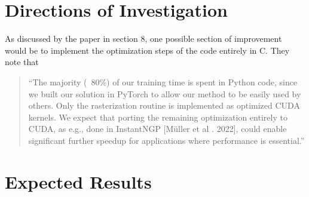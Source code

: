 \documentclass[12pt, a4paper, twocolumn]{article}
\begin{document}
\section{Directions of Investigation}
As discussed by the paper in section 8, one possible section of 
improvement would be to implement the optimization steps of the
code entirely in C. They note that 
\begin{quote}
  ``The majority (~80\%) of our training time is spent in Python code,
  since we built our solution in PyTorch to allow our method to be
  easily used by others. Only the rasterization routine is implemented
  as optimized CUDA kernels. We expect that porting the remaining
  optimization entirely to CUDA, as e.g., done in InstantNGP [Müller
  et al . 2022], could enable significant further speedup for applications
  where performance is essential.''
\end{quote}


\section{Expected Results}




\nocite{*}


\end{document}
